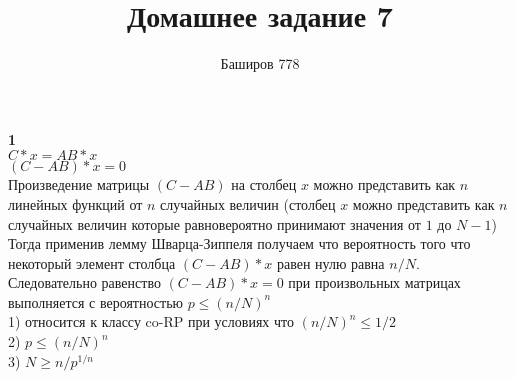 \documentclass[a4paper,12pt]{article}
\author{Баширов 778}
\title{Домашнее задание 7}
\begin{document}
\maketitle
\newpage
\noindent \large\textbf{1}\normalsize\\
$C*x = AB*x$\\ $(C - AB)*x = 0$\\ Произведение матрицы $(C - AB)$ на столбец $x$ можно представить как $n$ линейных функций от $n$ случайных величин (столбец $x$ можно представить как $n$ случайных величин которые равновероятно принимают значения от $1$ до $N-1$)\\ Тогда применив лемму Шварца-Зиппеля получаем что вероятность того что некоторый элемент столбца $(C - AB)*x$ равен нулю равна $n/N$. Следовательно равенство $(C - AB)*x = 0$ при произвольных матрицах выполняется с вероятностью $p\leq (n/N)^n$\\ 
1) относится к классу co-RP при условиях что $(n/N)^n \leq 1/2$\\
2) $p\leq (n/N)^n$\\
3) $N \geq n/p^{1/n}$\\
\end{document}
